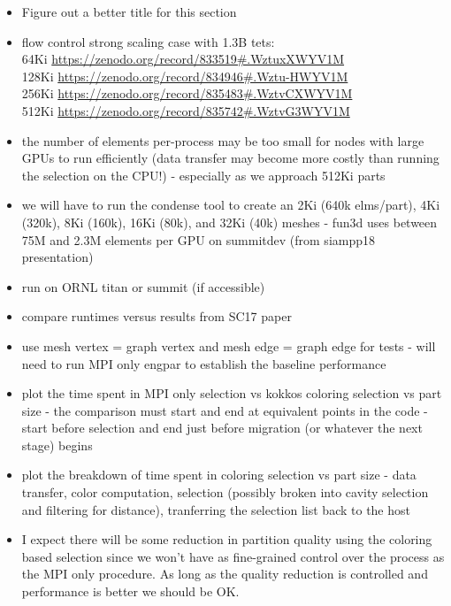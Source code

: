 \documentclass[graybox]{svmult}
\begin{document}
\begin{itemize}
  \item Figure out a better title for this section
  \item flow control strong scaling case with 1.3B tets: \\
64Ki \url{https://zenodo.org/record/833519#.WztuxXWYV1M} \\
128Ki \url{https://zenodo.org/record/834946#.Wztu-HWYV1M} \\
256Ki \url{https://zenodo.org/record/835483#.WztvCXWYV1M} \\
512Ki \url{https://zenodo.org/record/835742#.WztvG3WYV1M}
  \item the number of elements per-process may be too small for nodes with large GPUs to run efficiently (data transfer may become more costly than running the selection on the CPU!) - especially as we approach 512Ki parts
  \item we will have to run the condense tool to create an 2Ki (640k elms/part),
    4Ki (320k), 8Ki (160k), 16Ki (80k), and 32Ki (40k) meshes -
    fun3d uses between 75M and 2.3M elements per GPU on summitdev (from siampp18
    presentation)
  \item run on ORNL titan or summit (if accessible)
  \item compare runtimes versus results from SC17 paper~\cite{engparSC17}
  \item use mesh vertex = graph vertex and mesh edge = graph edge for tests -
    will need to run MPI only engpar to establish the baseline performance
  \item plot the time spent in MPI only selection vs kokkos coloring selection
    vs part size - the comparison must start and end at equivalent points in the
    code - start before selection and end just before migration (or whatever the
    next stage) begins
  \item plot the breakdown of time spent in coloring selection vs part size -
    data transfer, color computation, selection (possibly broken into cavity
    selection and filtering for distance), tranferring the selection list
    back to the host
  \item I expect there will be some reduction in partition quality using the
    coloring based selection since we won't have as fine-grained control over
    the process as the MPI only procedure.  As long as the quality reduction is
    controlled and performance is better we should be OK.
\end{itemize}
\end{document}
